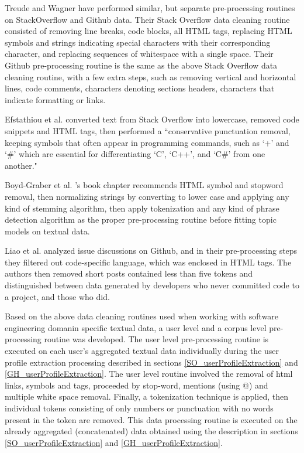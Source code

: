 Treude and Wagner \cite{treude2019predicting} have performed similar, but separate pre-processing routines on StackOverflow and Github data. Their Stack Overflow data cleaning routine consisted of removing line breaks, code blocks, all HTML tags, replacing HTML symbols and strings indicating special characters with their corresponding character, and replacing sequences of whitespace with a single space. Their Github pre-processing routine is the same as the above Stack Overflow data cleaning routine, with a few extra steps, such as removing vertical and horizontal lines, code comments, characters denoting sections headers, characters that indicate formatting or links. 

Efstathiou et al. \cite{efstathiou2018word} converted text from Stack Overflow into lowercase, removed code snippets and HTML tags, then performed a ``conservative punctuation removal, keeping symbols that often appear in programming commands, such as ‘+’ and ‘\#’ which are essential for differentiating ‘C’, ‘C++’, and ‘C\#’ from one another."

Boyd-Graber et al. \cite{boyd2014care}'s book chapter recommends HTML symbol and  stopword removal, then normalizing strings by converting to lower case and applying any kind of stemming algorithm, then apply tokenization and any kind of phrase detection algorithm as the proper pre-processing routine before fitting topic models on textual data.

Liao et al. \cite{liao2019status} analyzed issue discussions on Github, and in their pre-processing steps they filtered out code-specific language, which was enclosed in HTML tags. The authors then removed short posts contained less than five tokens and distinguished between data generated by developers who never committed code to a project, and those who did. 

Based on the above data cleaning routines used when working with software engineering domanin specific textual data, a user level and a corpus level pre-processing routine was developed. The user level pre-processing routine is executed on each user's aggregated textual data individually during the user profile extraction processing described in sections \ref{SO_userProfileExtraction} and \ref{GH_userProfileExtraction}. The user level routine involved the removal of html links, symbols and tags, proceeded by stop-word, mentions (using @) and multiple white space removal. Finally, a tokenization technique is applied, then individual tokens consisting of only numbers or punctuation with no words present in the token are removed. This data processing routine is executed on the already aggregated (concatenated) data obtained using the description in sections \ref{SO_userProfileExtraction} and \ref{GH_userProfileExtraction}.

